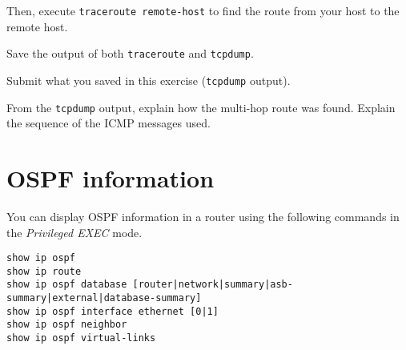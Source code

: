 \documentclass{../UTNetLab}
\begin{document}
    Then, execute \lstinline[emph={your-host, remote-host}]{traceroute remote-host} to find the route from your host to the remote host.

    Save the output of both \lstinline{traceroute} and \lstinline{tcpdump}.

    \begin{report}
        \item Submit what you saved in this exercise (\lstinline{tcpdump} output).

        \item From the \lstinline{tcpdump} output, explain how the multi-hop route was found.
    Explain the sequence of the ICMP messages used.
    \end{report}

\newpage
\appendix

\section{OSPF information}
    You can display OSPF information in a router using the following commands in the \textit{Privileged EXEC} mode.
    \begin{lstlisting}[language={cisco}]
show ip ospf
show ip route
show ip ospf database [router|network|summary|asb-summary|external|database-summary]
show ip ospf interface ethernet [0|1]
show ip ospf neighbor
show ip ospf virtual-links
    \end{lstlisting}
\end{document}
